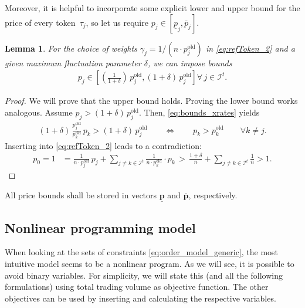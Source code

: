 \documentclass[11pt,parskip=full]{scrartcl}%
\newcommand*{\itokens}{\mathcal{I}^t}       %
\newtheorem{lemma}[theorem]{Lemma}
\begin{document}
Moreover, it is helpful to incorporate some explicit lower and upper bound for the price of every
token~$ \tau_j $, so let us require $ p_j \in [\underline{p}_j,\overline{p}_j] $.

\begin{lemma}
  For the choice of weights $ \gamma_j = 1 / (n \cdot p_j^\mathrm{old}) $ in \eqref{eq:refToken_2}
  and a given maximum fluctuation parameter $ \delta $, we can impose bounds
  \begin{align}
    p_j \in \left[ \left(\frac{1}{1+\delta}\right) \, p^\mathrm{old}_j, (1+\delta) \,
  p^
  \mathrm{old}_j \right] \forall \, j \in \itokens.
  \end{align}
\end{lemma}
\vspace{-.5cm}
\begin{proof}
  We will prove that the upper bound holds.
  Proving the lower bound works analogous.
  Assume $ p_j > (1+\delta) \, p_j^\mathrm{old} $.
  Then, \eqref{eq:bounds_xrates} yields
  \begin{align*}
    (1+\delta) \, \frac{p^\mathrm{old}_j}{p^\mathrm{old}_k} \, p_k > (1+\delta) \, p_j^\mathrm{old}
    \qquad \Leftrightarrow \qquad p_k > p_k^\mathrm{old}
    \qquad \forall k \neq j.
  \end{align*}
  Inserting into \eqref{eq:refToken_2} leads to a contradiction:
  \begin{align*}
    p_0 = 1
    &= \frac{1}{n \cdot p_j^\mathrm{old}} \, p_j + \sum\limits_{j \neq k \in \itokens}
      \frac{1}{n \cdot p_k^\mathrm{old}} \cdot p_k
    \, > \, \frac{1+\delta}{n} + \sum\limits_{j \neq k \in \itokens} \frac{1}{n} > 1.
  \end{align*}
\end{proof}
\vspace{-.4cm}

All price bounds shall be stored in vectors $\underline{\mathbf{p}}$ and $\overline{\mathbf{p}}$,
respectively.

\newpage
\subsection{Nonlinear programming model}
\label{subsec:NLPmodel}

When looking at the sets of constraints \eqref{eq:order_model_generic}, the most intuitive model seems to be a nonlinear program.
As we will see, it is possible to avoid binary variables.
For simplicity, we will state this (and all the following formulations) using total trading volume as objective function.
The other objectives can be used by inserting and calculating the respective variables.
\end{document}
